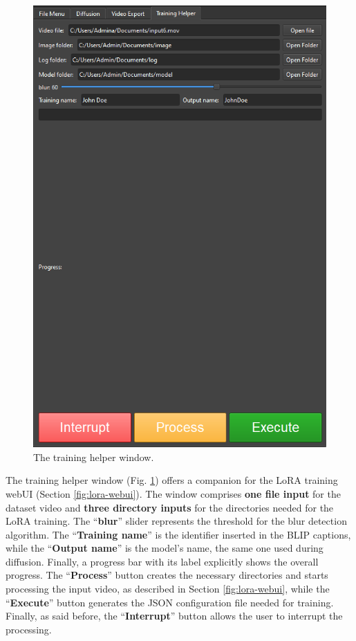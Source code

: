 \documentclass[preprint]{elsarticle}
\begin{document}
\begin{figure}[t]
	\centering
	\includegraphics[scale=0.3, keepaspectratio]{img/project_img/training-help.png}
	\caption{The training helper window.}
	\label{fig:training-helper}
\end{figure}


The training helper window (Fig. \ref{fig:training-helper}) offers a companion for the 
LoRA training webUI (Section \ref{fig:lora-webui}). 
The window comprises \textbf{one file input} for the dataset video and \textbf{three directory inputs} 
for the directories needed for the LoRA training. 
The ``\textbf{blur}'' slider represents the threshold for the blur detection algorithm. 
The ``\textbf{Training name}'' is the identifier inserted in the BLIP captions, 
while the ``\textbf{Output name}'' is the model's name, the same one used during diffusion. 
Finally, a progress bar with its label explicitly shows the overall progress.
The ``\textbf{Process}'' button creates the necessary directories and starts processing the 
input video, as described in Section \ref{fig:lora-webui}, while the ``\textbf{Execute}'' button generates the 
JSON configuration file needed for training.
Finally, as said before, the ``\textbf{Interrupt}'' button allows the user to interrupt the processing.
\end{document}
